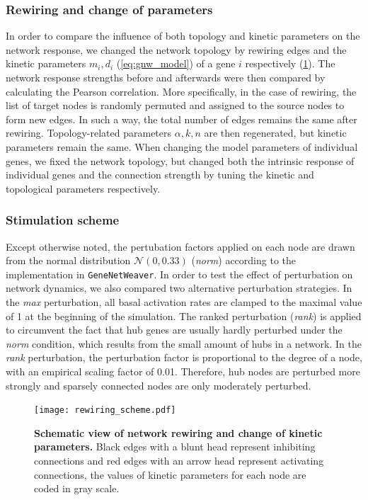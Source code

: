 
\subsubsection{Rewiring and change of parameters}
In order to compare the influence of both topology and 
kinetic parameters on 
the network response, we changed the network topology by rewiring edges and 
the kinetic parameters $m_i, d_i$ (\ref{eq:gnw_model}) of a gene $i$ 
respectively (\ref{fig:rewiring_scheme}). The
network response strengths before and afterwards were then compared by
calculating the Pearson correlation. More specifically, in the case of 
rewiring, the list of target nodes is randomly permuted and assigned to the
source nodes to form new edges. 
In such a way, the total number of edges
remains the same after rewiring. 
Topology-related parameters $\alpha, k, n$ are
then regenerated, but kinetic parameters remain the same. 
When changing the model parameters of individual genes, we fixed the network
topology, but changed both the intrinsic response of individual genes and 
the connection strength by tuning the kinetic and topological parameters 
respectively.

\subsubsection{Stimulation scheme}
Except otherwise noted, the pertubation factors applied on 
each node are drawn from the normal distribution 
$\mathcal{N}(0,0.33)$ (\emph{norm}) according to the 
implementation in \texttt{GeneNetWeaver}. In order to test the 
effect of perturbation on network dynamics, we also compared 
two alternative
perturbation strategies. In the \emph{max} perturbation, all basal activation
rates are clamped to the maximal value of 1 at the beginning of the
simulation. The ranked perturbation (\emph{rank}) is applied
to circumvent the fact that hub genes are usually hardly 
perturbed under the \emph{norm} condition, which results from
the small amount of hubs in a network. In the \emph{rank}
perturbation, the
perturbation factor is proportional to the degree of a node, with an empirical scaling 
factor of 0.01. Therefore, hub nodes are perturbed more strongly and 
sparsely connected nodes are only moderately perturbed.

\begin{figure}[!ht]
\begin{center}
\texttt{[image: rewiring\_scheme.pdf]}
\end{center}
\caption[Schematic view of network rewiring and kinetic parameter change]{
{\bf Schematic view of network rewiring and change of kinetic parameters.} 
Black edges with a blunt head represent inhibiting
connections and red edges with an arrow head represent activating
connections, the values of kinetic parameters for each node are 
coded in gray scale. 
}
\label{fig:rewiring_scheme}
\end{figure}

